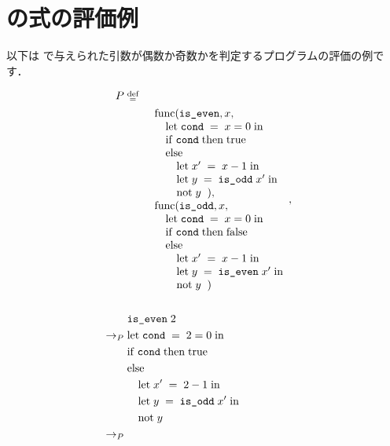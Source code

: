 
\section{\Yil の式の評価例}
\label{sec:lang:semantics:example}

\par 以下は \Yil で与えられた引数が偶数か奇数かを判定するプログラムの評価の例です．

\begin{align*}
  P \; &\defeq& \; \\
  &\quad\quad \begin{array}{l}
    \Func
      {\code{is\_even}}{x}
      {\\ \quad \Let
        {\; \code{cond} \;}{\; x=0 \;}
        {\\ \quad \If{\; \code{cond} \;}{\; \true \\ \quad}
        {\\ \quad\quad \Let{\; x' \;}{\; x-1 \;}
        {\\ \quad\quad \Let{\; y \;}{\; \App{\code{is\_odd}}{x'} \;}
        {\\ \quad\quad \App{\mathrm{not}}{y} \;}}} \;}
      }, \\
    \Func
      {\code{is\_odd}}{x}
      {\\ \quad \Let
        {\; \code{cond} \;}{\; x = 0 \;}
        {\\ \quad \If{\; \code{cond} \;}{\; \false \\ \quad}
        {\\ \quad\quad \Let{\; x' \;}{\; x-1 \;}
        {\\ \quad\quad \Let{\; y \;}{\; \App{\code{is\_even}}{x'} \;}
        {\\ \quad\quad \App{\mathrm{not}}{y} \;}}} \;}
      }
  \end{array}, \\\\ &
    \Reduce{P}{\App{\code{is\_even}}{2} \\}{
    \Reduce{P}{
      & \Let{\; \code{cond} \;}{\; 2 = 0 \;}{ \\
      & \If{\; \code{cond} \;}{\; \true \\ &}{\\
      & \quad \Let{\; x' \;}{\; 2 - 1 \;}{\\
      & \quad \Let{\; y \;}{\App{\; \code{is\_odd}}{x' \;}}{\\
      & \quad \App{\mathrm{not}}{y}}}}} \\ }{
}}
\end{align*}
